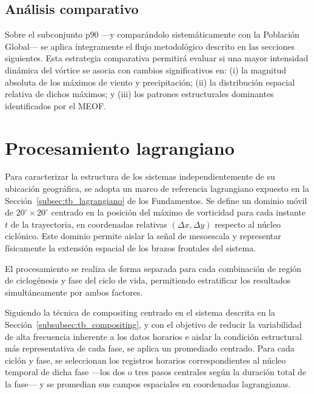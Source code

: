 

\subsection{Análisis comparativo}\label{subsec:estrategia_analise}

Sobre el subconjunto p90 —y comparándolo sistemáticamente con la Población Global— se aplica íntegramente el flujo metodológico descrito en las secciones siguientes. Esta estrategia comparativa permitirá evaluar si una mayor intensidad dinámica del vórtice se asocia con cambios significativos en: (i) la magnitud absoluta de los máximos de viento y precipitación; (ii) la distribución espacial relativa de dichos máximos; y (iii) los patrones estructurales dominantes identificados por el MEOF.


\section{Procesamiento lagrangiano}\label{sec:procesamiento_lagrangiano}

Para caracterizar la estructura de los sistemas independientemente de su ubicación geográfica, se adopta un marco de referencia lagrangiano expuesto en la Sección~\ref{subsec:tb_lagrangiano} de los Fundamentos. Se define un dominio móvil de $20^{\circ} \times 20^{\circ}$ centrado en la posición del máximo de vorticidad para cada instante $t$ de la trayectoria, en coordenadas relativas $(\Delta x, \Delta y)$ respecto al núcleo ciclónico. Este dominio permite aislar la señal de mesoescala y representar físicamente la extensión espacial de los brazos frontales del sistema.

El procesamiento se realiza de forma separada para cada combinación de región de ciclogénesis y fase del ciclo de vida, permitiendo estratificar los resultados simultáneamente por ambos factores.

Siguiendo la técnica de compositing centrado en el sistema descrita en la Sección~\ref{subsubsec:tb_compositing}, y con el objetivo de reducir la variabilidad de alta frecuencia inherente a los datos horarios e aislar la condición estructural más representativa de cada fase, se aplica un promediado centrado. Para cada ciclón y fase, se seleccionan los registros horarios correspondientes al núcleo temporal de dicha fase —los dos o tres pasos centrales según la duración total de la fase— y se promedian sus campos espaciales en coordenadas lagrangianas.

